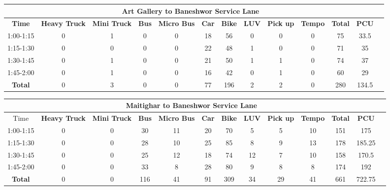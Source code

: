 \begin{landscape}
\centering
\begin{table}[h!]
\centering
\begin{tabular}{|c|c|c|c|c|c|c|c|c|c|c|c|c|}
    \hline
    \multicolumn{12}{|c|}{\textbf{Art Gallery to Baneshwor Service Lane}} \\
    \hline
    \textbf{Time} & \textbf{Heavy Truck} & \textbf{Mini Truck} & \textbf{Bus} & \textbf{Micro Bus} & \textbf{Car} & \textbf{Bike} & \textbf{LUV} & \textbf{Pick up} & \textbf{Tempo} & \textbf{\textbf{Total}} & \textbf{PCU} \\
    \hline
1:00-1:15	&0	&1	&0	&0	&18	&56	&0	&0	&0	&75	&33.5 \\ \hline
1:15-1:30	&0	&0	&0	&0	&22	&48	&1	&0	&0	&71	&35 \\ \hline
1:30-1:45	&0	&1	&0	&0	&21	&50	&1	&1	&0	&74	&37 \\ \hline
1:45-2:00	&0	&1	&0	&0	&16	&42	&0	&1	&0	&60	&29 \\ \hline
\textbf{Total}	&0	&3	&0	&0	&77	&196	&2	&2	&0	&280	&134.5 \\ \hline


\end{tabular}

\vspace{0.5cm}


\begin{tabular}{|c|c|c|c|c|c|c|c|c|c|c|c|c|}
    \hline
    \multicolumn{12}{|c|}{\textbf{Maitighar to Baneshwor Service Lane}} \\
    \hline
    Time & \textbf{Heavy Truck} & \textbf{Mini Truck} & \textbf{Bus} & \textbf{Micro Bus} & \textbf{Car} & \textbf{Bike} & \textbf{LUV} & \textbf{Pick up} & \textbf{Tempo} & \textbf{\textbf{Total}} & \textbf{PCU} \\
    \hline
1:00-1:15	&0	&0	&30	&11	&20	&70	&5	&5	&10	&151	&175 \\ \hline
1:15-1:30	&0	&0	&28	&10	&25	&85	&8	&9	&13	&178	&185.25 \\ \hline
1:30-1:45	&0	&0	&25	&12	&18	&74	&12	&7	&10	&158	&170.5 \\ \hline
1:45-2:00	&0	&0	&33	&8	&28	&80	&9	&8	&8	&174	&192 \\ \hline
\textbf{Total}	&0	&0	&116	&41	&91	&309	&34	&29	&41	&661	&722.75 \\ \hline

\end{tabular}


\end{table}
\end{landscape}
